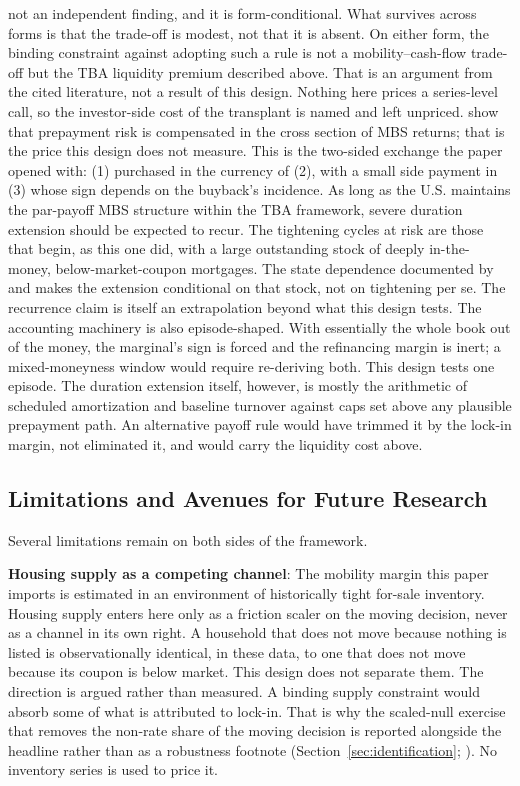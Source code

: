 \documentclass[12pt]{article}
\begin{document}
not an independent finding, and it is form-conditional. What survives across forms is that the trade-off is modest, not that it is absent. On either form, the binding constraint against adopting such a rule is not a mobility--cash-flow trade-off but the TBA liquidity premium described above. That is an argument from the cited literature, not a result of this design. Nothing here prices a series-level call, so the investor-side cost of the transplant is named and left unpriced. \citet{diep2021} show that prepayment risk is compensated in the cross section of MBS returns; that is the price this design does not measure. This is the two-sided exchange the paper opened with: (1) purchased in the currency of (2), with a small side payment in (3) whose sign depends on the buyback's incidence. As long as the U.S. maintains the par-payoff MBS structure within the TBA framework, severe duration extension should be expected to recur. The tightening cycles at risk are those that begin, as this one did, with a large outstanding stock of deeply in-the-money, below-market-coupon mortgages. The state dependence documented by \citet{berger2021} and \citet{eichenbaum2022} makes the extension conditional on that stock, not on tightening per se. The recurrence claim is itself an extrapolation beyond what this design tests. The accounting machinery is also episode-shaped. With essentially the whole book out of the money, the marginal's sign is forced and the refinancing margin is inert; a mixed-moneyness window would require re-deriving both. This design tests one episode. The duration extension itself, however, is mostly the arithmetic of scheduled amortization and baseline turnover against caps set above any plausible prepayment path. An alternative payoff rule would have trimmed it by the lock-in margin, not eliminated it, and would carry the liquidity cost above.

\subsection{Limitations and Avenues for Future Research}\label{sec:limitations}

Several limitations remain on both sides of the framework.

\textbf{Housing supply as a competing channel}: The mobility margin this paper imports is estimated in an environment of historically tight for-sale inventory. Housing supply enters here only as a friction scaler on the moving decision, never as a channel in its own right. A household that does not move because nothing is listed is observationally identical, in these data, to one that does not move because its coupon is below market. This design does not separate them. The direction is argued rather than measured. A binding supply constraint would absorb some of what is attributed to lock-in. That is why the scaled-null exercise that removes the non-rate share of the moving decision is reported alongside the headline rather than as a robustness footnote (Section~\ref{sec:identification}; \citealp{aladangady2024,hsieh2019}). No inventory series is used to price it.
\end{document}
